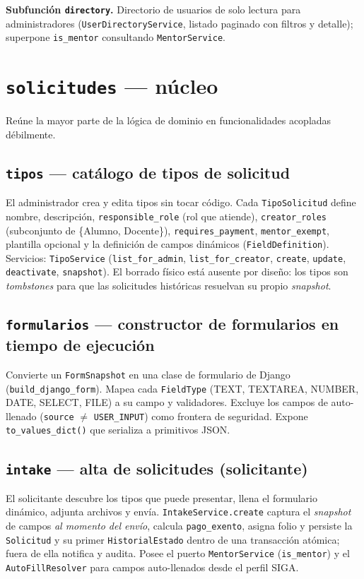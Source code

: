 \documentclass[12pt,letterpaper]{report}
\begin{document}
\textbf{Subfunción \texttt{directory}.} Directorio de usuarios de solo lectura
para administradores (\texttt{UserDirectoryService}, listado paginado con filtros
y detalle); superpone \texttt{is\_mentor} consultando \texttt{MentorService}.

\section{\texttt{solicitudes} — núcleo}

Reúne la mayor parte de la lógica de dominio en funcionalidades acopladas
débilmente.

\subsection{\texttt{tipos} — catálogo de tipos de solicitud}
El administrador crea y edita tipos sin tocar código. Cada \texttt{TipoSolicitud}
define nombre, descripción, \texttt{responsible\_role} (rol que atiende),
\texttt{creator\_roles} (subconjunto de \{Alumno, Docente\}),
\texttt{requires\_payment}, \texttt{mentor\_exempt}, plantilla opcional y la
definición de campos dinámicos (\texttt{FieldDefinition}). Servicios:
\texttt{TipoService} (\texttt{list\_for\_admin}, \texttt{list\_for\_creator},
\texttt{create}, \texttt{update}, \texttt{deactivate}, \texttt{snapshot}). El
borrado físico está ausente por diseño: los tipos son \textit{tombstones} para
que las solicitudes históricas resuelvan su propio \textit{snapshot}.

\subsection{\texttt{formularios} — constructor de formularios en tiempo de ejecución}
Convierte un \texttt{FormSnapshot} en una clase de formulario de Django
(\texttt{build\_django\_form}). Mapea cada \texttt{FieldType} (TEXT, TEXTAREA,
NUMBER, DATE, SELECT, FILE) a su campo y validadores. Excluye los campos de
auto-llenado (\texttt{source} $\neq$ \texttt{USER\_INPUT}) como frontera de
seguridad. Expone \texttt{to\_values\_dict()} que serializa a primitivos JSON.

\subsection{\texttt{intake} — alta de solicitudes (solicitante)}
El solicitante descubre los tipos que puede presentar, llena el formulario
dinámico, adjunta archivos y envía. \texttt{IntakeService.create} captura el
\textit{snapshot} de campos \emph{al momento del envío}, calcula
\texttt{pago\_exento}, asigna folio y persiste la \texttt{Solicitud} y su primer
\texttt{HistorialEstado} dentro de una transacción atómica; fuera de ella
notifica y audita. Posee el puerto \texttt{MentorService} (\texttt{is\_mentor})
y el \texttt{AutoFillResolver} para campos auto-llenados desde el perfil SIGA.
\end{document}

